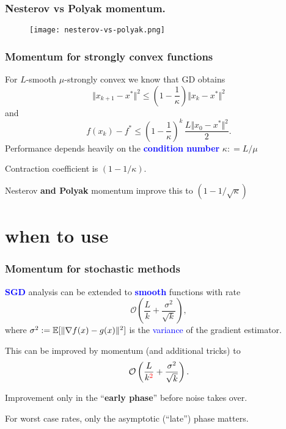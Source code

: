 \documentclass[aspectratio=149]{beamer}
\begin{document}
\begin{frame}
  \frametitle{Nesterov vs Polyak momentum.}
  \vspace{-0.2cm}
  \begin{figure}[ht]
    \centering
    \texttt{[image: nesterov-vs-polyak.png]}
  \end{figure}
\end{frame}

\begin{frame}
  \frametitle{Momentum for strongly convex functions}

  For $L$-smooth $\mu$-strongly convex we know that GD obtains
  \begin{equation}
    \Vert x_{k+1} - x^* \Vert^2 \le \left(1 - \frac{1}{\kappa}\right) \Vert x_k -x^* \Vert^2
  \end{equation}
  and
  \begin{equation}
    f(x_k)-f^* \le {\left(1-\frac{1}{\kappa}\right)}^k \, \frac{L \Vert x_0 -x^* \Vert^2}{2}.
  \end{equation}
  Performance depends heavily on the \textbf{\textcolor{blue}{condition number}} $\kappa : = L/\mu$
  \begin{block}{}
    \center
    Contraction coefficient is $(1-1/\kappa)$.
  \end{block}

  Nesterov \textbf{and Polyak} momentum improve this to $(1-1/\sqrt{\kappa})$
\end{frame}


\section{when to use}%
\label{sec:}

\begin{frame}
  \frametitle{Momentum for stochastic methods}
  \textbf{\textcolor{blue}{SGD}} analysis can be extended to \textbf{\textcolor{blue}{smooth}} functions with rate
  \begin{equation}
    \mathcal{O}\left(\frac{L}{k} + \frac{\sigma^2}{\sqrt{k}}\right),
  \end{equation}
  where $\sigma^2:= \mathbb{E} [ \Vert \nabla f(x) - g(x) \Vert^2 ]$ is the \textcolor{blue}{variance} of the gradient estimator.

  \medskip
  This can be improved by momentum (and additional tricks) to
  \begin{equation}
    \mathcal{O}\left(\frac{L}{k^{\textcolor{red}{2}}} + \frac{\sigma^2}{\sqrt{k}}\right).
  \end{equation}

  Improvement only in the ``\textbf{early phase}'' before noise takes over.

  \begin{block}{}
    \centering
    For worst case rates, only the asymptotic (``late'') phase matters.
  \end{block}
\end{frame}
\end{document}
